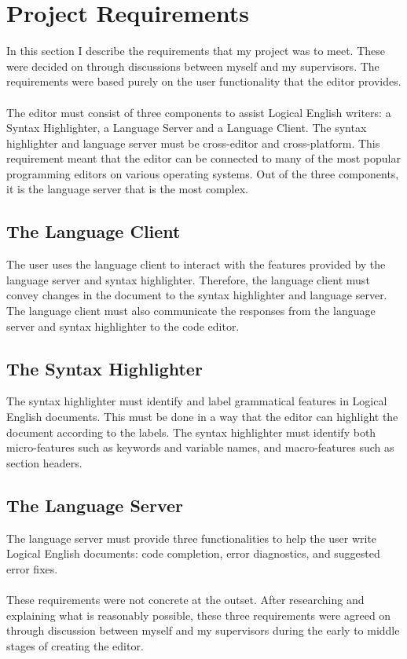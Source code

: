 \documentclass[../main.tex]{subfiles}
\begin{document}
\chapter{Project Requirements}
\label{section:project-requirements}
In this section I describe the requirements that my project was to meet. These were decided on through discussions between myself and my supervisors. The requirements were based purely on the user functionality that the editor provides.
\\
\\
The editor must consist of three components to assist Logical English writers: a Syntax Highlighter, a Language Server and a Language Client. The syntax highlighter and language server must be cross-editor and cross-platform. This requirement meant that the editor can be connected to many of the most popular programming editors on various operating systems. Out of the three components, it is the language server that is the most complex.


\section{The Language Client}
The user uses the language client to interact with the features provided by the language server and syntax highlighter. Therefore, the language client must convey changes in the document to the syntax highlighter and language server. The language client must also communicate the responses from the language server and syntax highlighter to the code editor.

\section{The Syntax Highlighter}
The syntax highlighter must identify and label grammatical features in Logical English documents. This must be done in a way that the editor can highlight the document according to the labels. The syntax highlighter must identify both micro-features such as keywords and variable names, and macro-features such as section headers.

\section{The Language Server}
The language server must provide three functionalities to help the user write Logical English documents: code completion, error diagnostics, and suggested error fixes. 
\\ 
\\
These requirements were not concrete at the outset. After researching and explaining what is reasonably possible, these three requirements were agreed on through discussion between myself and my supervisors during the early to middle stages of creating the editor. 
\end{document}
